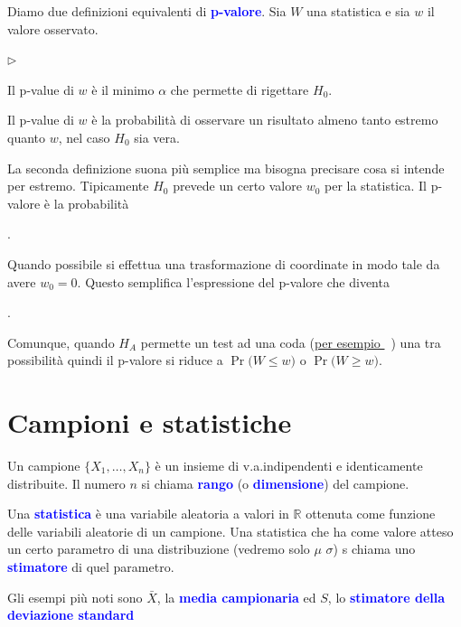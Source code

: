 \documentclass[12pt,openany]{book}
\def\RR{\mathds R}
\newcommand{\mylabel}[1]{{\footnotesize\textsf{#1}}\hfill}
\renewenvironment{itemize}
  {\begin{list}{$\triangleright$}{%
   \setlength{\parskip}{0mm}
   \setlength{\topsep}{.2\baselineskip}
   \setlength{\rightmargin}{0mm}
   \setlength{\listparindent}{0mm}
   \setlength{\itemindent}{0mm}
   \setlength{\labelwidth}{3ex}
   \setlength{\itemsep}{.4\baselineskip}
   \setlength{\parsep}{0mm}
   \setlength{\partopsep}{0mm}
   \setlength{\labelsep}{1ex}
   \setlength{\leftmargin}{\labelwidth+\labelsep}
   \let\makelabel\mylabel}}{%
   \end{list}\vspace*{-1.3mm}}
\def\emph#1{\textcolor{blue}{\textbf{\boldmath #1}}}
\theoremstyle{mio}
\theoremstyle{liscio}
\begin{document}
Diamo due definizioni equivalenti di \emph{p-valore}. Sia $W$ una statistica e sia $w$ il valore osservato. 


\begin{itemize}
\item Il p-value di $w$ è il minimo $\alpha$ che permette di rigettare $H_0$.

\item Il p-value di $w$ è la probabilità di osservare un risultato almeno tanto estremo quanto $w$, nel caso $H_0$ sia vera. 
\end{itemize}

La seconda definizione suona più semplice ma bisogna precisare cosa si intende per estremo. Tipicamente $H_0$ prevede un certo valore $w_0$ per la statistica. Il p-valore è la probabilità 

\ceq{\hfill \emph{p-valore}}{=}{\Pr\big(|W-w_0|\ge |w-w_0|\big)}

. 

Quando possibile si effettua una trasformazione di coordinate in modo tale da avere $w_0=0$. Questo semplifica l'espressione del p-valore che diventa 

.

Comunque, quando $H_A$ permette un test ad una coda (\hyperref[Bernoulli_test]{per esempio \faShare}\ ) una tra possibilità quindi il p-valore si riduce a $\Pr\big(W\le w\big)$ o $\Pr\big(W\ge w\big)$.



\hfill{}\clearpage\section{Campioni e statistiche}

Un campione $\{X_1,\dots,X_n\}$ è un insieme di v.a.\@ indipendenti e identicamente distribuite. Il numero $n$ si chiama \emph{rango\/} (o \emph{dimensione\/}) del campione. 

Una \emph{statistica\/} è una variabile aleatoria a valori in $\RR$ ottenuta come funzione delle variabili aleatorie di un campione. Una statistica che ha come valore atteso un certo parametro di una distribuzione (vedremo solo $\mu$  $\sigma$) s chiama uno  \emph{stimatore\/} di quel parametro.

Gli esempi più noti sono $\bar X$, la \emph{media campionaria\/} ed $S$, lo \emph{stimatore della deviazione standard\/} 
\end{document}
